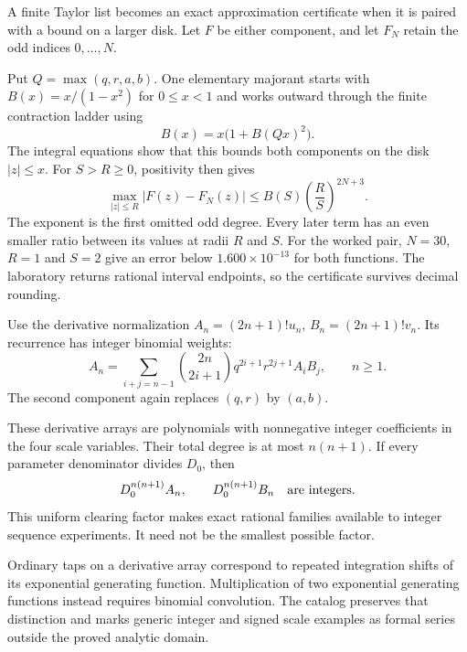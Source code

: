 A finite Taylor list becomes an exact approximation certificate when it
is paired with a bound on a larger disk. Let $F$ be either component,
and let $F_N$ retain the odd indices $0,\ldots,N$.


Put $Q=\max(q,r,a,b)$. One elementary majorant starts with
$B(x)=x/(1-x^2)$ for $0\le x<1$ and works outward through the finite
contraction ladder using
\[
B(x)=x\bigl(1+B(Qx)^2\bigr).
\]
The integral equations show that this bounds both components on the disk
$|z|\le x$. For $S>R\ge0$, positivity then gives
\[
\boxed{\max_{|z|\le R}|F(z)-F_N(z)|
\le B(S)\left(\frac RS\right)^{2N+3}.}
\]
The exponent is the first omitted odd degree. Every later term has an
even smaller ratio between its values at radii $R$ and $S$.
For the worked pair, $N=30$, $R=1$ and $S=2$ give an error below
$1.600\times10^{-13}$ for both functions. The laboratory returns
rational interval endpoints, so the certificate survives decimal rounding.

Use the derivative normalization
$A_n=(2n+1)!u_n$, $B_n=(2n+1)!v_n$. Its recurrence has integer
binomial weights:
\[
A_n=\sum_{i+j=n-1}\binom{2n}{2i+1}
q^{2i+1}r^{2j+1}A_iB_j,\qquad n\ge1.
\]
The second component again replaces $(q,r)$ by $(a,b)$.


These derivative arrays are polynomials with nonnegative integer
coefficients in the four scale variables. Their total degree is at most
$n(n+1)$. If every parameter denominator divides $D_0$, then
\[
D_0^{n(n+1)}A_n,\qquad D_0^{n(n+1)}B_n
\quad\hbox{are integers}.
\]
This uniform clearing factor makes exact rational families available to
integer sequence experiments. It need not be the smallest possible factor.

Ordinary taps on a derivative array correspond to repeated integration
shifts of its exponential generating function. Multiplication of two
exponential generating functions instead requires binomial convolution.
The catalog preserves that distinction and marks generic integer and
signed scale examples as formal series outside the proved analytic domain.

